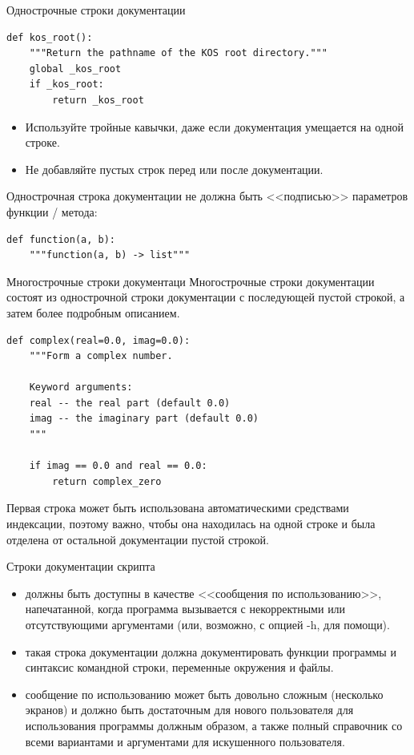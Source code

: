 \documentclass[xcolor=table]{beamer}
\begin{document}
\begin{frame}[fragile]{Однострочные строки документации}
	\begin{verbatim}
def kos_root():
	"""Return the pathname of the KOS root directory."""
	global _kos_root
	if _kos_root: 
		return _kos_root
	\end{verbatim}
	\begin{itemize}
		\item Используйте тройные кавычки, даже если документация умещается на одной строке. 
		\item Не добавляйте пустых строк перед или после документации.
	\end{itemize}
	
	\medskip
	
	Однострочная строка документации не должна быть <<подписью>> параметров функции /
метода:
	\begin{verbatim}
def function(a, b):
	"""function(a, b) -> list"""
	\end{verbatim}
\end{frame}

\begin{frame}[fragile]{Многострочные строки документаци}
	Многострочные строки документации состоят из однострочной строки документации с
последующей пустой строкой, а затем более подробным описанием. 
	\begin{verbatim}
def complex(real=0.0, imag=0.0):
	"""Form a complex number.
	
	Keyword arguments:
	real -- the real part (default 0.0)
	imag -- the imaginary part (default 0.0)
	"""

	if imag == 0.0 and real == 0.0: 
		return complex_zero
	\end{verbatim}
	Первая строка может быть использована автоматическими средствами индексации, поэтому важно, чтобы она находилась на одной строке и была отделена от остальной документации пустой строкой. 
\end{frame}

\begin{frame}[fragile]{Строки документации скрипта}
	\begin{itemize}
		\item должны быть доступны в качестве <<сообщения по использованию>>, напечатанной, когда программа вызывается с некорректными или отсутствующими аргументами (или, возможно, с опцией -h, для
помощи). 
		\item такая строка документации должна документировать функции программы и
синтаксис командной строки, переменные окружения и файлы. 
		\item сообщение по использованию может быть довольно сложным (несколько экранов) и должно быть достаточным для нового пользователя для использования программы должным образом, а также полный справочник со всеми вариантами и аргументами для искушенного пользователя. 
	\end{itemize}	
\end{frame}
\end{document}
